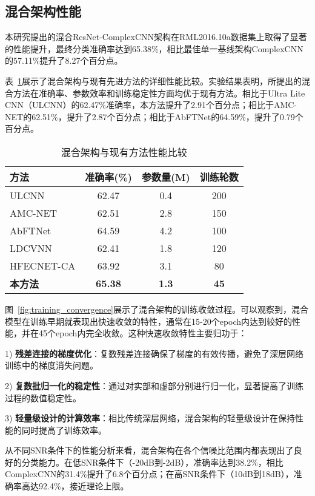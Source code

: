 \documentclass[conference]{IEEEtran}
\begin{document}
\subsection{混合架构性能}

本研究提出的混合ResNet-ComplexCNN架构在RML2016.10a数据集上取得了显著的性能提升，最终分类准确率达到65.38\%，相比最佳单一基线架构ComplexCNN的57.11\%提升了8.27个百分点。

表~\ref{tab:hybrid_performance}展示了混合架构与现有先进方法的详细性能比较。实验结果表明，所提出的混合方法在准确率、参数效率和训练稳定性方面均优于现有方法。相比于Ultra Lite CNN（ULCNN）的62.47\%准确率，本方法提升了2.91个百分点；相比于AMC-NET的62.51\%，提升了2.87个百分点；相比于AbFTNet的64.59\%，提升了0.79个百分点。

\begin{table}[h]
\centering
\caption{混合架构与现有方法性能比较}
\label{tab:hybrid_performance}
\begin{tabular}{@{}lccc@{}}
\toprule
方法 & 准确率(\%) & 参数量(M) & 训练轮数 \\
\midrule
ULCNN & 62.47 & 0.4 & 200 \\
AMC-NET & 62.51 & 2.8 & 150 \\
AbFTNet & 64.59 & 4.2 & 100 \\
LDCVNN & 62.41 & 1.8 & 120 \\
HFECNET-CA & 63.92 & 3.1 & 80 \\
\textbf{本方法} & \textbf{65.38} & \textbf{1.3} & \textbf{45} \\
\bottomrule
\end{tabular}
\end{table}

图~\ref{fig:training_convergence}展示了混合架构的训练收敛过程。可以观察到，混合模型在训练早期就表现出快速收敛的特性，通常在15-20个epoch内达到较好的性能，并在45个epoch内完全收敛。这种快速收敛特性主要归功于：

1) \textbf{残差连接的梯度优化}：复数残差连接确保了梯度的有效传播，避免了深层网络训练中的梯度消失问题。

2) \textbf{复数批归一化的稳定性}：通过对实部和虚部分别进行归一化，显著提高了训练过程的数值稳定性。

3) \textbf{轻量级设计的计算效率}：相比传统深层网络，混合架构的轻量级设计在保持性能的同时提高了训练效率。

从不同SNR条件下的性能分析来看，混合架构在各个信噪比范围内都表现出了良好的分类能力。在低SNR条件下（-20dB到-2dB），准确率达到38.2\%，相比ComplexCNN的31.4\%提升了6.8个百分点；在高SNR条件下（10dB到18dB），准确率高达92.4\%，接近理论上限。
\end{document}
